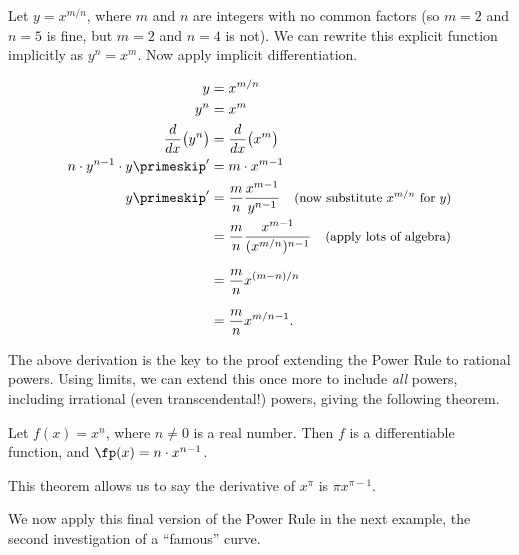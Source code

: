 Let $y = x^{m/n}$, where $m$ and $n$ are integers with no common factors (so $m=2$ and $n=5$ is fine, but $m=2$ and $n=4$ is not). We can rewrite this explicit function implicitly as $y^n = x^m$. Now apply implicit differentiation.

\begin{align*}
y &= x^{m/n} \\
y^n &= x^m \\
\frac{d}{dx}\big(y^n\big) &= \frac{d}{dx}\big(x^m\big) \\
n\cdot y^{n-1}\cdot y\primeskip' &= m\cdot x^{m-1} \\
y\primeskip' 	&= \frac{m}{n} \frac{x^{m-1}}{y^{n-1}} \quad \mbox{\small (now substitute $x^{m/n}$ for $y$)} \\
 		&= \frac{m}{n} \frac{x^{m-1}}{(x^{m/n})^{n-1}} \quad \mbox{\small (apply lots of algebra)}\\
		&= \frac{m}n x^{(m-n)/n}\rule{0pt}{18pt}\\
		&= \frac{m}n x^{m/n -1}.\rule{0pt}{18pt}
\end{align*}

The above derivation is the key to the proof extending the Power Rule to rational powers. Using limits, we can extend this once more to include \textit{all} powers, including irrational (even transcendental!) powers, giving the following theorem.

{Let $f(x) = x^n$, where $n\neq 0$ is a real number. Then $f$ is a differentiable function, and $\fp(x) = n\cdot x^{n-1}$.
}

This theorem allows us to say the derivative of $x^\pi$ is $\pi x^{\pi -1}$. 

We now apply this final version of the Power Rule in the next example, the second investigation of a ``famous'' curve.\\

